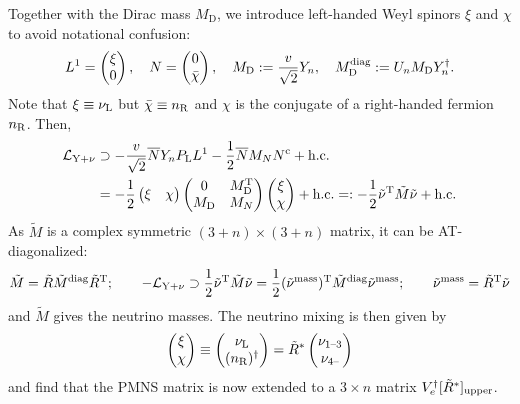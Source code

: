 \documentclass[CheatSheet]{subfiles}
\newcommand\MD[1][]{M_{\mathrm{D}#1}}
\newcommand\MN[1][]{M_{N#1}}
\begin{document}
Together with the Dirac mass $\MD$, we introduce left-handed Weyl spinors $\xi$ and $\chi$ to avoid notational confusion:
\begin{equation}
 L^1 = \pmat{\xi\\0},\quad
 N   = \pmat{0\\\bar\chi},\quad
 \MD := \frac{v}{\sqrt2}Y_n,\quad
 \MD\wdiag := U_n \MD Y_n^\dagger.
\end{equation}
Note that $\xi\equiv\nu_{\mathrm{L}}$ but $\bar\chi\equiv n_{\mathrm{R}}$ and $\chi$ is the conjugate of a right-handed fermion $n_{\mathrm{R}}$. Then,
\begin{align}
\label{eq:MajoranaNuLag}
 \mathcal L\w{Y+\nu} 
&\supset
 -\frac{v}{\sqrt2}\overline{N}Y_n \PL L^1 - \frac{1}{2}\overline{N}\MN N^\cc + \text{h.c.}
\\&
=-\frac12\pmat{\xi & \chi}\pmat{0 & \MD^\TT \\ \MD & \MN} \pmat{\xi \\ \chi} + \text{h.c.} =: -\frac12\tilde\nu^\TT \tilde M\tilde \nu+\text{h.c.}
\end{align}
As $\tilde M$ is a complex symmetric $(3+n)\times(3+n)$ matrix, it can be AT-diagonalized:
\begin{equation}
  \tilde M = \tilde R \tilde M^{\text{diag}} \tilde R^{\mathrm{T}};
\qquad
-\mathcal L_{\mathrm{Y+\nu}}\supset
\frac12\tilde \nu^{\mathrm{T}} \tilde M\tilde\nu
=\frac12(\tilde\nu^{\text{mass}})^{\mathrm{T}} \tilde M^{\text{diag}} \tilde\nu^{\text{mass}};\qquad \tilde\nu^{\text{mass}} =\tilde R^{\mathrm{T}}\tilde\nu
\end{equation}
and $\tilde M$ gives the neutrino masses.
The neutrino mixing is then given by
\begin{align}
 \begin{pmatrix}\xi\\\chi\end{pmatrix} \equiv \begin{pmatrix}\nu_{\mathrm{L}}\\(n_{\mathrm{R}})^\dagger\end{pmatrix} = \tilde R^*\begin{pmatrix}\nu_{1\text{--}3} \\ \nu_{4\text{--}}\end{pmatrix}
\end{align}
and find that the PMNS matrix is now extended to a $3\times n$ matrix $V_e^\dagger [\tilde R^*]_{\mathrm{upper}}$.
\end{document}
